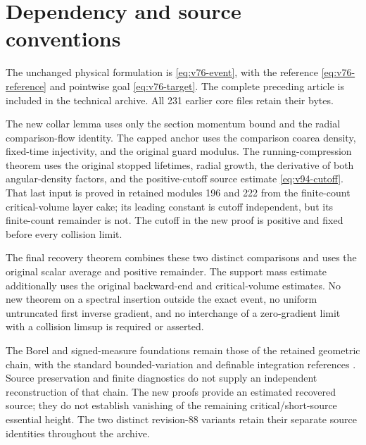 \section{Dependency and source conventions}
\label{app:v97-dependencies}
The unchanged physical formulation is \eqref{eq:v76-event}, with the
reference \eqref{eq:v76-reference} and pointwise goal
\eqref{eq:v76-target}. The complete preceding article is included in
the technical archive. All 231 earlier core files retain their bytes.

The new collar lemma uses only the section momentum bound and the
radial comparison-flow identity. The capped anchor uses the comparison
coarea density, fixed-time injectivity, and the original guard modulus.
The running-compression theorem uses the original stopped lifetimes,
radial growth, the derivative of both angular-density factors, and the
positive-cutoff source estimate \eqref{eq:v94-cutoff}. That last input
is proved in retained modules 196 and 222 from the finite-count
critical-volume layer cake; its leading constant is cutoff independent,
but its finite-count remainder is not. The cutoff in the new proof is
positive and fixed before every collision limit.

The final recovery theorem combines these two distinct comparisons
and uses the original scalar average and positive remainder. The
support mass estimate additionally uses the original backward-end and
critical-volume estimates. No new theorem on a spectral insertion
outside the exact event, no uniform untruncated first inverse gradient,
and no interchange of a zero-gradient limit with a collision limsup
is required or asserted.

The Borel and signed-measure foundations remain those of the retained
geometric chain, with the standard bounded-variation and definable
integration references \cite{AFP,CMInt,Coste}. Source preservation and
finite diagnostics do not supply an independent reconstruction of
that chain. The new proofs provide an estimated recovered source;
they do not establish vanishing of the remaining critical/short-source
essential height. The two distinct revision-88 variants retain their
separate source identities throughout the archive.
